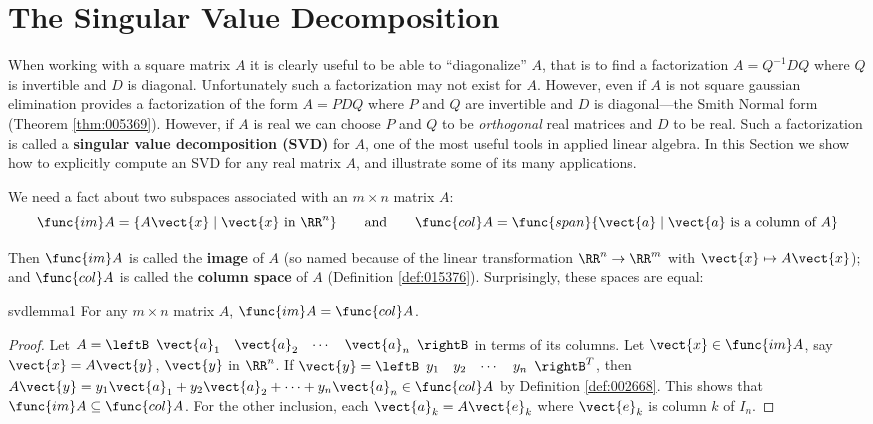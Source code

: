 
\section{The Singular Value Decomposition}\label{sec:SVD}

\noindent When working with a square matrix $A$ it is clearly useful to be
able to ``diagonalize'' $A$, that is to
find a factorization $A=Q^{-1}DQ$ where $Q$ is invertible and $D$ is
diagonal. Unfortunately such a factorization may not exist for $A$. However,
even if $A$ is not square gaussian elimination provides a factorization of
the form $A=PDQ$ where $P$ and $Q$ are invertible and $D$ is diagonal---the
Smith Normal form (Theorem \ref{thm:005369}). However, if $A$ is real we can choose $P$ and $Q$ to be \emph{orthogonal} real matrices and $D$ to be real.
Such a factorization is called a \textbf{singular value decomposition (SVD)}
for $A$, one of the most useful tools in applied linear algebra. In this
Section we show how to explicitly compute an SVD for any real matrix $A$,
and illustrate some of its many applications.

We need a fact about two subspaces associated with an $m\times n$ matrix $A$:
\begin{equation*}
\func{im}A=\{A\vect{x}\mid \vect{x} \mbox{ in } \RR^{n}\}\qquad \mbox{and}\qquad \func{col}A=\func{span}\{\vect{a}\mid\vect{a} \mbox{ is a column of }A\}
\end{equation*}

\noindent Then $\func{im}A$ is called the \textbf{image} of $A$ (so
named because of the linear transformation $\RR^{n}\rightarrow \RR^{m}$ with $\vect{x}\mapsto A\vect{x}$); and $\func{col}A$
is called the \textbf{column space} of $A$ (Definition \ref{def:015376}). Surprisingly,
these spaces are equal:

\begin{lemma}{}{svdlemma1}
For any $m\times n$ matrix $A$, $\func{im} A=\func{col} A$.
\end{lemma}

\begin{proof} Let $A=\leftB \begin{array}{cccc} \vect{a}_{1} & \vect{a}_{2} & \cdots & \vect{a}_{n} \end{array}\rightB$ in terms of its columns. Let $\vect{x}\in \func{im} A$, say $\vect{x}=A\vect{y}$, $\vect{y}$ in $\RR^{n}$. If $\vect{y}=\leftB \begin{array}{cccc} y_{1} & y_{2} & \cdots & y_{n}\end{array}\rightB^{T}$, then $A\vect{y}=y_{1}\vect{a}_{1}+y_{2}\vect{a}_{2}+\cdots +y_{n}\vect{a}_{n}\in \func{col} A$ by
Definition \ref{def:002668}. This shows that $\func{im} A\subseteq \func{col}A$.
For the other inclusion, each $\vect{a}_{k}=A\vect{e}_{k}$ where $\vect{e}_{k}$ is column $k$ of $I_{n}$. 
\end{proof}


